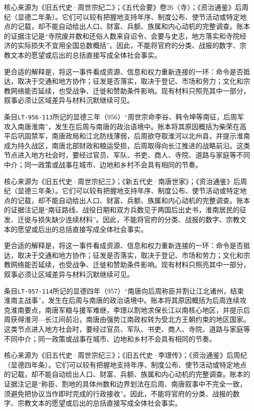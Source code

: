 核心来源为《旧五代史·周世宗纪二》；《五代会要》卷26〈寺〉；《资治通鉴》后周纪（显德二年条）。它们可以较有把握地支持年序、制度公布、使节活动或特定地点的记载，却不能自动给出人口、财富、兵额、族属和内心动机的完整调查。账本的证据注记是“寺院废并数和还俗人数来自诏令、会要与史志，地方落实和寺院经济的实际损失不宜用全国总数概括”。因此，不能将官府的分类、战报的数字、宗教文本的愿望或后出的总括直接写成全体社会事实。

更合适的解释是，将这一事件看成资源、信息和权力重新连接的一环：命令是否抵达，取决于交通和地方协作；征发是否落实，取决于登记、市场和劳力；文化和宗教网络能否延续，也受战争、迁徙和赞助条件影响。现有材料只照亮其中一部分，叙事必须让区域差异与材料沉默继续可见。

条目\texttt{LT-956-113}所记的显德三年（956）“周世宗命李谷、韩令坤等南征，后周军攻入南唐淮南”，发生在后周与南唐的政治语境中。账本将其原因概括为柴荣在高平后巩固禁军，南唐政局和江北防线薄弱，后周欲夺取淮河以北州县，并提示淮南成为持久战区，南唐北部财政和粮运受损，后周取得向长江推进的战略前沿。这类节点进入地方社会时，要经过官员、军队、书吏、商人、寺院、道路与家庭等不同中介；同一政策或战事在城市、边地和乡村不会具有相同的节奏。

核心来源为《旧五代史·周世宗纪三》；《新五代史·南唐世家》；《资治通鉴》后周纪（显德三年条）。它们可以较有把握地支持年序、制度公布、使节活动或特定地点的记载，却不能自动给出人口、财富、兵额、族属和内心动机的完整调查。账本的证据注记是“南征路线、战役日期和双方兵数见于两国后出史书，淮南居民的征发、迁徙与损失缺少连续材料”。因此，不能将官府的分类、战报的数字、宗教文本的愿望或后出的总括直接写成全体社会事实。

更合适的解释是，将这一事件看成资源、信息和权力重新连接的一环：命令是否抵达，取决于交通和地方协作；征发是否落实，取决于登记、市场和劳力；文化和宗教网络能否延续，也受战争、迁徙和赞助条件影响。现有材料只照亮其中一部分，叙事必须让区域差异与材料沉默继续可见。

条目\texttt{LT-957-114}所记的显德四年（957）“南唐向后周称臣并割让江北诸州，结束淮南主战事”，发生在后周与南唐的政治语境中。账本将其原因概括为后周连续攻克淮南要点，南唐军粮与援军难继，李璟以割地求保长江以南核心地区，并提示后周获得淮河—长江间前沿，南唐由强势江南政权转为受北方王朝约束的地区国家。这类节点进入地方社会时，要经过官员、军队、书吏、商人、寺院、道路与家庭等不同中介；同一政策或战事在城市、边地和乡村不会具有相同的节奏。

核心来源为《旧五代史·周世宗纪三》；《旧五代史·李璟传》；《资治通鉴》后周纪（显德四年条）。它们可以较有把握地支持年序、制度公布、使节活动或特定地点的记载，却不能自动给出人口、财富、兵额、族属和内心动机的完整调查。账本的证据注记是“称臣、割地的具体州数和边界划法在后周、南唐叙事中不完全一致，须避免把协议当作即时完成的行政接收”。因此，不能将官府的分类、战报的数字、宗教文本的愿望或后出的总括直接写成全体社会事实。

